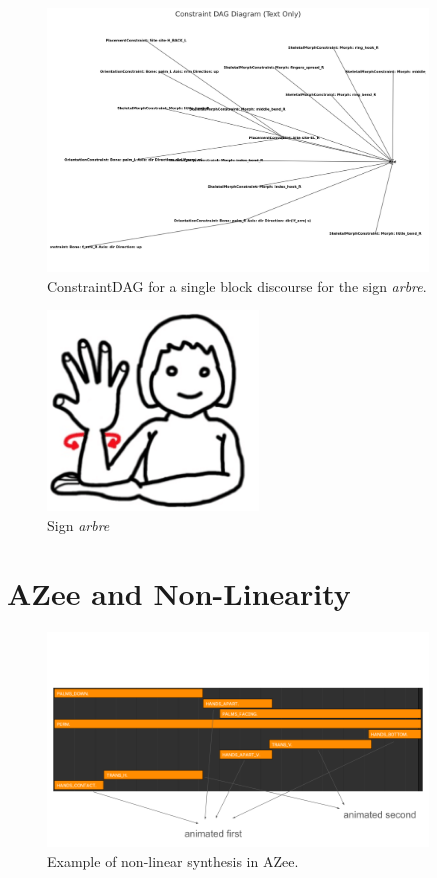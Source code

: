 \documentclass[../../main.tex]{subfiles}
\begin{document}
\begin{figure}[h]
    \centering
    \includegraphics[width=0.9\textwidth]{chapters/multi_track/images/constraint_dag.png}
    \caption{ConstraintDAG for a single block discourse for the sign \emph{arbre}.}
    \label{fig:constraint_dag_tree}
\end{figure}

\begin{figure}[h]
    \centering
    \includegraphics[width=0.5\textwidth]{chapters/multi_track/images/tree.png}
    \caption{Sign \emph{arbre}~\cite{boutetetal}}
    \label{fig:tree_sign}
\end{figure}

\section{AZee and Non-Linearity}
\label{ch:multi_track:azee_nl}

\begin{figure}
    \centering
    \includegraphics[width=0.9\textwidth]{chapters/multi_track/images/example_azee_non_linear.png}
    \caption{Example of non-linear synthesis in AZee.}
    \label{fig:example_azee_non_linear}
\end{figure}
\end{document}
